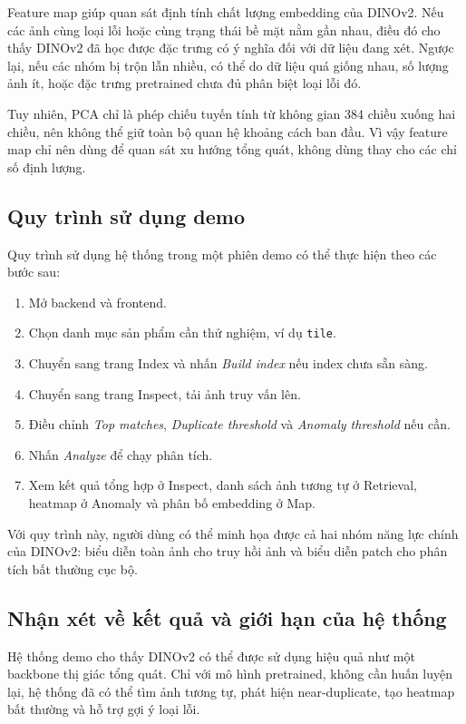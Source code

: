 Feature map giúp quan sát định tính chất lượng embedding của DINOv2. Nếu các ảnh cùng loại lỗi hoặc cùng trạng thái bề mặt nằm gần nhau, điều đó cho thấy DINOv2 đã học được đặc trưng có ý nghĩa đối với dữ liệu đang xét. Ngược lại, nếu các nhóm bị trộn lẫn nhiều, có thể do dữ liệu quá giống nhau, số lượng ảnh ít, hoặc đặc trưng pretrained chưa đủ phân biệt loại lỗi đó.

Tuy nhiên, PCA chỉ là phép chiếu tuyến tính từ không gian 384 chiều xuống hai chiều, nên không thể giữ toàn bộ quan hệ khoảng cách ban đầu. Vì vậy feature map chỉ nên dùng để quan sát xu hướng tổng quát, không dùng thay cho các chỉ số định lượng.

\subsection{Quy trình sử dụng demo}
Quy trình sử dụng hệ thống trong một phiên demo có thể thực hiện theo các bước sau:

\begin{enumerate}
    \item Mở backend và frontend.
    \item Chọn danh mục sản phẩm cần thử nghiệm, ví dụ \texttt{tile}.
    \item Chuyển sang trang Index và nhấn \textit{Build index} nếu index chưa sẵn sàng.
    \item Chuyển sang trang Inspect, tải ảnh truy vấn lên.
    \item Điều chỉnh \textit{Top matches}, \textit{Duplicate threshold} và \textit{Anomaly threshold} nếu cần.
    \item Nhấn \textit{Analyze} để chạy phân tích.
    \item Xem kết quả tổng hợp ở Inspect, danh sách ảnh tương tự ở Retrieval, heatmap ở Anomaly và phân bố embedding ở Map.
\end{enumerate}

Với quy trình này, người dùng có thể minh họa được cả hai nhóm năng lực chính của DINOv2: biểu diễn toàn ảnh cho truy hồi ảnh và biểu diễn patch cho phân tích bất thường cục bộ.

\subsection{Nhận xét về kết quả và giới hạn của hệ thống}
Hệ thống demo cho thấy DINOv2 có thể được sử dụng hiệu quả như một backbone thị giác tổng quát. Chỉ với mô hình pretrained, không cần huấn luyện lại, hệ thống đã có thể tìm ảnh tương tự, phát hiện near-duplicate, tạo heatmap bất thường và hỗ trợ gợi ý loại lỗi.

